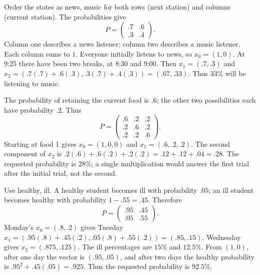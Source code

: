 Order the states as news, music for both rows (next station) and columns
(current station). The probabilities give
\[
 P=\begin{pmatrix}.7&.6\\.3&.4\end{pmatrix}.
\]
Column one describes a news listener; column two describes a music listener.
Each column sums to $1$.
Everyone initially listens to news, so $x_0=(1,0)$.
At 9:25 there have been two breaks, at 8:30 and 9:00.
Then $x_1=(.7,.3)$ and
$x_2=(.7(.7)+.6(.3),.3(.7)+.4(.3))=(.67,.33)$.
Thus $33\%$ will be listening to music.

The probability of retaining the current food is $.6$; the other two
possibilities each have probability $.2$. Thus
\[
 P=\begin{pmatrix}.6&.2&.2\\.2&.6&.2\\.2&.2&.6\end{pmatrix}.
\]
Starting at food 1 gives $x_0=(1,0,0)$ and $x_1=(.6,.2,.2)$.
The second component of $x_2$ is
$.2(.6)+.6(.2)+.2(.2)=.12+.12+.04=.28$.
The requested probability is $28\%$; a single multiplication would answer
the first trial after the initial trial, not the second.

Use healthy, ill. A healthy student becomes ill with probability $.05$;
an ill student becomes healthy with probability $1-.55=.45$. Therefore
\[
 P=\begin{pmatrix}.95&.45\\.05&.55\end{pmatrix}.
\]
Monday's $x_0=(.8,.2)$ gives Tuesday
$x_1=(.95(.8)+.45(.2),.05(.8)+.55(.2))=(.85,.15)$.
Wednesday gives $x_2=(.875,.125)$. The ill percentages are $15\%$ and $12.5\%$.
From $(1,0)$, after one day the vector is $(.95,.05)$, and after two days
the healthy probability is $.95^2+.45(.05)=.925$.
Thus the requested probability is $92.5\%$.

